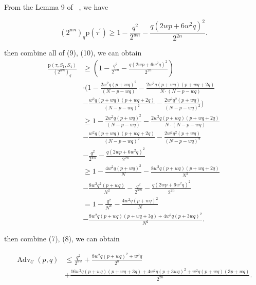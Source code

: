 From the Lemma 9 of ~\cite{cogliati2018wide}, we have

$$
\left(2^{w n}\right)_{q} \mathrm{p}\left(\tau^{\prime}\right) \geq 1-\frac{q^{2}}{2^{w n}}-\frac{q\left(2 w p+6 w^{2} q\right)^{2}}{2^{2 n}}.
$$

\noindent then combine all of (9), (10), we can obtain
$$
\begin{aligned}
\frac{\mathrm{p}\left(\tau, S_{1}, S_{4}\right)}{\left(2^{w n}\right)_{q}} &\geq (1-\frac{q^{2}}{2^{w n}}-\frac{q\left(2 w p+6 w^{2} q\right)^{2}}{2^{2 n}})\\
&\cdot (1- \frac{2 w^{2} q (p+w q)^{2}}{(N-p-w q)} -\frac{2 w^{2} q (p+w q)(p+w q+2 q)}{N \cdot (N-p-w q)}\\
&- \frac{w^{2} q (p+w q)(p+w q+2 q)}{(N-p-w q)^2} - \frac{2 w^{2} q^{2} (p+w q)}{(N- p- wq)^2})\\
&\geq 1- \frac{2 w^{2} q (p+w q)^{2}}{(N-p-w q)} -\frac{2 w^{2} q (p+w q)(p+w q+2 q)}{N \cdot (N-p-w q)}\\
&- \frac{w^{2} q (p+w q)(p+w q+2 q)}{(N-p-w q)^2} - \frac{2 w^{2} q^{2} (p+w q)}{(N- p- wq)^2}\\
& -\frac{q^{2}}{2^{w n}}-\frac{q\left(2 w p+6 w^{2} q\right)^{2}}{2^{2 n}}\\
&\geq 1- \frac{4 w^2 q(p+wq)^2}{N} - \frac{8 w^2 q(p+w q)(p+w q +2 q)}{N^2}\\
&- \frac{8 w^2 q^2(p+w q)}{N^2} - \frac{q^{2}}{2^{w n}}-\frac{q\left(2 w p+6 w^{2} q\right)^{2}}{2^{2 n}}\\
&= 1 - \frac{q^2}{N^w} - \frac{4 w^2 q(p+wq)^2}{N}\\
&- \frac{8 w^2 q(p+w q)(p+w q +3 q)+4 w^2 q(p+3 wq)^2}{N^2}.
\end{aligned}
$$

\noindent then combine (7), (8), we can obtain

$$
\begin{aligned}
\operatorname{Adv}_{\mathcal{C}}\left(p, q\right) &\leq \frac{q^2}{2^{n w}} + \frac{8 w^2 q(p+wq)^2+w^2 q}{2^n}\\
&+ \frac{16 w^2 q(p+w q)(p+w q +3 q)+4 w^2 q(p+3 wq)^2+ w^2q(p+w q)(3p+w q)}{2^{2 n}}.
\end{aligned}
$$




